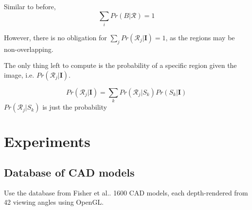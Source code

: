 \documentclass[10pt,a4paper]{article}
\makeatletter
\newcommand*{\ea}{et al.\@\xspace}
\newcommand{\prob}{Pr}
\newcommand{\rgbdimage}{\mathbf{I}}
\newcommand{\imregion}{\mathcal{R}}
\newcommand{\basisshape}{B}
\makeatother
\begin{document}
Similar to before,
$$
\sum_i \prob(\basisshape|\imregion) = 1
$$

However, there is no obligation for $\sum_j \prob(\imregion_j | \rgbdimage) = 1$, as the regions may be non-overlapping.

The only thing left to compute is the probability of a specific region given the image, i.e. $\prob(\imregion_j|\rgbdimage)$. 

$$
\prob(\imregion_j | \rgbdimage) = \sum_{k} \prob(\imregion_j|S_k)\prob(S_k|\rgbdimage)
$$
$\prob(\imregion_j | S_k)$ is just the probability 


\section{Experiments}

\subsection{Database of CAD models}
Use the database from Fisher \ea \cite{fisher-siggrraphasia-2012}.
1600 CAD models, each depth-rendered from 42 viewing angles using OpenGL.


%


\end{document}
